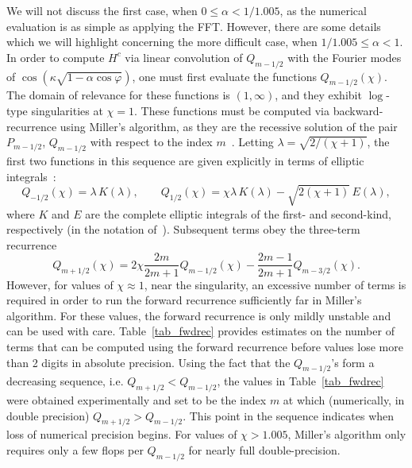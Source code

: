 \documentclass[11pt]{article}
\renewcommand{\phi}{\varphi}
\numberwithin{equation}{section}
\begin{document}
We will not discuss the first case, when $0 \leq \alpha < 1/1.005$, as
the numerical evaluation is as simple as applying the FFT.
However,
there are some details which we will highlight concerning the more
difficult case, when $1/1.005 \leq \alpha < 1$.  In order to compute
$H^c$ via linear convolution of $Q_{m-1/2}$ with the Fourier modes of
$\cos(\kappa\sqrt{1-\alpha \cos\phi})$, one must first evaluate the
functions $Q_{m-1/2}(\chi)$.  The domain of relevance for these functions is
$(1,\infty)$, and they exhibit $\log$-type singularities at $\chi=1$.
These functions must be computed via backward-recurrence using
Miller's algorithm, as they are the recessive solution of the pair
$P_{m-1/2}$, $Q_{m-1/2}$ with respect to the index
$m$~\cite{gil_2007}.  Letting $\lambda = \sqrt{2/(\chi+1)}$, the first
two functions in this sequence are given explicitly in terms of
elliptic integrals~\cite{nist}:
\begin{equation}
 Q_{-1/2}(\chi) = \lambda \, K(\lambda), \qquad Q_{1/2}(\chi) = 
\chi \lambda  \, K(\lambda) 
 - \sqrt{2(\chi+1)} \, E(\lambda),
\end{equation}
where $K$ and $E$ are the complete elliptic integrals of the first-
and second-kind, respectively (in the notation of~\cite{nist}).
  Subsequent
terms obey the three-term recurrence
\begin{equation}
  \label{eq_gmrecurrence}
  Q_{m+1/2}(\chi) =  2\chi \frac{2m}{2m+1} Q_{m-1/2}(\chi) -
  \frac{2m-1}{2m+1} Q_{m-3/2}(\chi).
\end{equation}
However, for values of $\chi \approx 1$, near the singularity, an
excessive number of terms is required in order to run the forward
recurrence sufficiently far in Miller's algorithm.  For these values,
the forward recurrence is only mildly unstable and can be used with
care. Table~\ref{tab_fwdrec} provides estimates on the number of terms
that can be computed using the forward recurrence before values lose
more than 2 digits in absolute precision.  Using the fact that the
$Q_{m-1/2}$'s form a decreasing sequence, i.e.  $Q_{m+1/2} <
Q_{m-1/2}$, the values in Table~\ref{tab_fwdrec} were obtained
experimentally and set to be the index $m$ at which (numerically, in
double precision) $Q_{m+1/2} > Q_{m-1/2}$. This point in the sequence
indicates when loss of numerical precision begins. For values of $\chi >
1.005$, Miller's algorithm only requires only a few flops per
$Q_{m-1/2}$ for nearly full double-precision.
\end{document}
